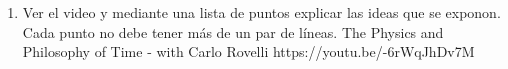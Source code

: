\documentclass[12pt,a4paper]{report}
\begin{document}
\begin{enumerate}
{\begin{center}
			\end{center}
		}
		\item {
			Ver el video y mediante una lista de puntos explicar las ideas que se
			exponon. Cada punto no debe tener más de un par de líneas.
			The Physics and Philosophy of Time - with Carlo Rovelli https://youtu.be/-6rWqJhDv7M
		}
	\end{enumerate}
\end{document}
